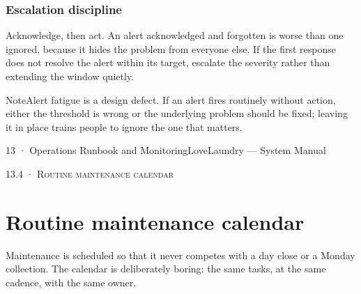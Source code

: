 \documentclass[11pt,a4paper,oneside]{book}
\begin{document}
\subsubsection*{Escalation discipline}
Acknowledge, then act. An alert acknowledged and forgotten is worse than one ignored, because it hides the problem from everyone else. If the first response does not resolve the alert within its target, escalate the severity rather than extending the window quietly.

\begin{notebox}NoteAlert fatigue is a design defect. If an alert fires routinely without action, either the threshold is wrong or the underlying problem should be fixed; leaving it in place trains people to ignore the one that matters.\end{notebox}
13 · Operations Runbook and MonitoringLoveLaundry — System Manual

\textsc{\small\color{crimson}13.4 · Routine maintenance calendar}\par\medskip
\section*{Routine maintenance calendar}
Maintenance is scheduled so that it never competes with a day close or a Monday collection. The calendar is deliberately boring: the same tasks, at the same cadence, with the same owner.
\end{document}
